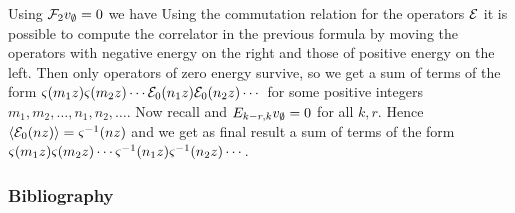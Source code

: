 \documentclass[10pt,handout]{beamer} %
\begin{document}
\begin{frame}

Using $\mathcal F_2v_\emptyset=0$ we have
\pause
Using the commutation relation for the operators $\mathcal E$ it is possible to compute the correlator in the previous formula by moving the operators with negative energy on the right and those of positive energy on the left. Then only operators of zero energy survive, so we get a sum of terms of the form $\varsigma(m_1z)\varsigma(m_2z)\cdots\mathcal E_0(n_1z)\mathcal E_0(n_2z)\cdots$ for some positive integers $m_1,m_2,\ldots,n_1,n_2,\ldots$. \pause
Now recall
and $E_{k-r,k}v_\emptyset=0$ for all $k,r$. Hence $\langle\mathcal E_0(nz)\rangle=\varsigma^{-1}(nz)$ and we get as final result a sum of terms of the form $\varsigma(m_1z)\varsigma(m_2z)\cdots\varsigma^{-1}(n_1z)\varsigma^{-1}(n_2z)\cdots$.  

\end{frame}

\begin{frame}[allowframebreaks]
\frametitle{Bibliography}
	
	\nocite{*}
	\printbibliography


\end{frame}
\end{document}
